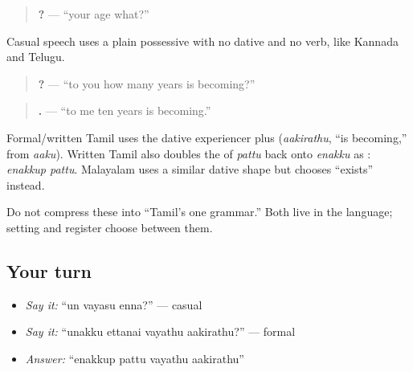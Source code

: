 \begin{grammarlens}[title={Grammar Lens: Casual possessive}]
\begin{quote}
\textbf{  ?} — \textquotedblleft{}your age what?\textquotedblright{}
\end{quote}

Casual speech uses a plain possessive with no dative and no verb, like Kannada and Telugu.
\end{grammarlens}

\begin{grammarlens}[title={Grammar Lens: Formal dative plus \textquotedblleft{}become\textquotedblright{}}]
\begin{quote}
\textbf{   ?} — \textquotedblleft{}to you how many years is becoming?\textquotedblright{}
\end{quote}

\begin{quote}
\textbf{   .} — \textquotedblleft{}to me ten years is becoming.\textquotedblright{}
\end{quote}

Formal/written Tamil uses the dative experiencer plus \textbf{} (\emph{aakirathu}, \textquotedblleft{}is becoming,\textquotedblright{} from \emph{aaku}). Written Tamil also doubles the \textbf{} of \emph{pattu} back onto \emph{enakku} as \textbf{}: \emph{enakkup pattu}. Malayalam uses a similar dative shape but chooses \textquotedblleft{}exists\textquotedblright{} instead.

Do not compress these into \textquotedblleft{}Tamil's one grammar.\textquotedblright{} Both live in the language; setting and register choose between them.
\end{grammarlens}

\subsection*{Your turn}
\begin{itemize}
\raggedright
  \item \emph{Say it:} \textquotedblleft{}un vayasu enna?\textquotedblright{} — casual
  \item \emph{Say it:} \textquotedblleft{}unakku ettanai vayathu aakirathu?\textquotedblright{} — formal
  \item \emph{Answer:} \textquotedblleft{}enakkup pattu vayathu aakirathu\textquotedblright{}
\end{itemize}

